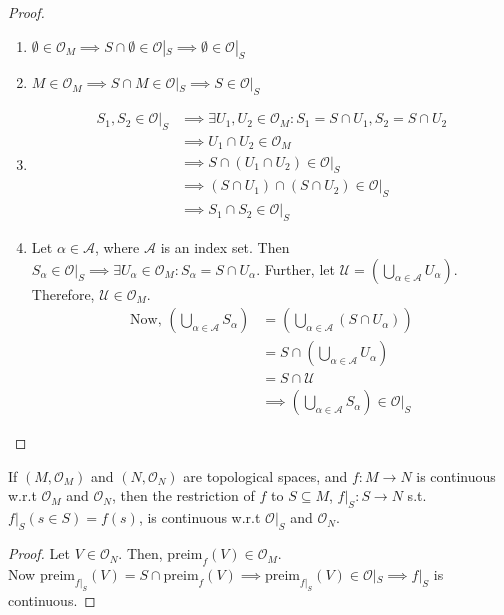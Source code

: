 \begin{proof}
\begin{enumerate}
\item $\emptyset \in \mathcal{O}_{M} \implies S \cap \emptyset \in \mathcal{O}|_S \implies \emptyset \in \mathcal{O}|_S$
\item $M \in \mathcal{O}_{M} \implies S \cap M \in \mathcal{O}|_S \implies S \in \mathcal{O}|_S$
\item \begin{align*}
S_1, S_2 \in \mathcal{O}|_S &\implies \exists U_1, U_2 \in \mathcal{O}_{M} : S_1 = S \cap U_1, S_2 = S \cap U_2 \\
&\implies U_1 \cap U_2 \in \mathcal{O}_{M} \\
&\implies S \cap (U_1 \cap U_2) \in \mathcal{O}|_S \\
&\implies (S \cap U_1) \cap (S \cap U_2) \in \mathcal{O}|_S \\
&\implies S_1 \cap S_2 \in \mathcal{O}|_S
\end{align*}
\item Let $\alpha \in \mathcal{A}$, where $\mathcal{A}$ is an index set. Then \\
$S_{\alpha} \in \mathcal{O}|_S \implies \exists U_{\alpha} \in \mathcal{O}_{M} : S_{\alpha} = S \cap U_{\alpha}$. Further, let $\mathcal{U} = \left( \bigcup_{\alpha \in \mathcal{A}} U_{\alpha} \right)$. Therefore, $\mathcal{U} \in \mathcal{O}_{M}$. \\
\begin{align*}
\text{Now, }\left( \bigcup_{\alpha \in \mathcal{A}} S_{\alpha} \right) &= \left( \bigcup_{\alpha \in \mathcal{A}} (S \cap U_{\alpha}) \right) \\
&= S \cap \left( \bigcup_{\alpha \in \mathcal{A}} U_{\alpha} \right) \\
&= S \cap \mathcal{U} \\
&\implies \left( \bigcup_{\alpha \in \mathcal{A}} S_{\alpha} \right) \in \mathcal{O}|_S
\end{align*}
\end{enumerate}
\end{proof}

\begin{theorem}
If $(M, \mathcal{O}_{M})$ and $(N, \mathcal{O}_{N})$ are topological spaces, and $f: M \to N$ is continuous w.r.t $\mathcal{O}_{M}$ and $\mathcal{O}_{N}$, then the restriction of $f$ to $S \subseteq M$, $f|_S: S \to N$ s.t. $f|_S(s \in S) = f(s)$, is continuous w.r.t $\mathcal{O}|_S$ and $\mathcal{O}_{N}$.
\end{theorem}

\begin{proof}
Let $V \in \mathcal{O}_N$. Then, $\text{preim}_{f}(V) \in \mathcal{O}_M$. \\
Now $\text{preim}_{f|_S}(V) = S \cap \text{preim}_{f}(V) \implies \text{preim}_{f|_S}(V) \in \mathcal{O}|_S \implies f|_S$ is continuous. 
\end{proof}

